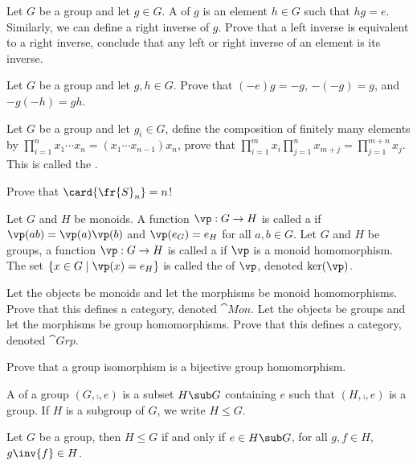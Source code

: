 \documentclass[10pt]{article}
\begin{document}
\begin{problem}
    Let $G$ be a group and let $g\in G$. A  of $g$ is an element $h\in G$ such that $hg=e$. Similarly, we can define a right inverse of $g$. Prove that a left inverse is equivalent to a right inverse, conclude that any left or right inverse of an element is its inverse.
\end{problem}
\begin{problem}
    Let $G$ be a group and let $g,h\in G$. Prove that $(-e)g=-g$, $-(-g)=g$, and $-g(-h)=gh$.
\end{problem}
\begin{problem}
    Let $G$ be a group and let ${g}_{i}\in G$, define the composition of finitely many elements by ${\prod}_{i=1}^{n}{x}_{1}\cdots{x}_{n}=({x}_{1}\cdots{x}_{n-1}){x}_{n}$, prove that ${\prod}_{i=1}^{m}{x}_{i}{\prod}_{j=1}^{n}{x}_{m+j}={\prod}_{j=1}^{m+n}{x}_{j}$. This is called the .
\end{problem}
\begin{problem}
    Prove that $\card{{\fr{S}}_{n}}=n$!
\end{problem}
\begin{definition}
    Let $G$ and $H$ be monoids. A function $\vp:G\to H$ is called a  if $\vp(ab)=\vp(a)\vp(b)$ and $\vp({e}_{G})={e}_{H}$ for all $a,b\in G$. Let $G$ and $H$ be groups, a function $\vp:G\to H$ is called a  if $\vp$ is a monoid homomorphism. The set $\{x\in G\mid\vp(x)={e}_{H}\}$ is called the  of $\vp$, denoted $\ker(\vp)$.
\end{definition}
\begin{problem}
    Let the objects be monoids and let the morphisms be monoid homomorphisms. Prove that this defines a category, denoted $\cat{Mon}$. Let the objects be groups and let the morphisms be group homomorphisms. Prove that this defines a category, denoted $\cat{Grp}$.
\end{problem}
\begin{problem}
    Prove that a group isomorphism is a bijective group homomorphism.
\end{problem}
\begin{definition}
    A  of a group $(G,\comp,e)$ is a subset $H\sub G$ containing $e$ such that $(H,\comp,e)$ is a group. If $H$ is a subgroup of $G$, we write $H\le G$.
\end{definition}
\begin{proposition}
    Let $G$ be a group, then $H\le G$ if and only if $e\in H\sub G$, for all $g,f\in H$, $g\inv{f}\in H$. 
\end{proposition}
\end{document}
